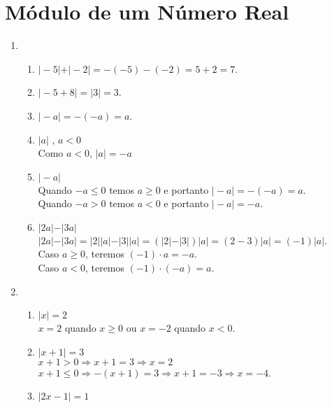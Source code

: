 \documentclass[10pt]{book}
\begin{document}
\section{Módulo de um Número Real}
\begin{enumerate}
	\setcounter{enumi}{0}
	\item %
	\begin{enumerate}
		\item %
		$\vert-5\vert + \vert-2\vert = -(-5) - (-2) = 5 + 2 = 7$.
		\item %
		$\vert-5 + 8\vert = \vert 3 \vert = 3$.
		\item %
		$\vert-a\vert = -(-a) = a$.
		\item %
		$\vert a \vert$ , $a < 0$\\
		Como $a < 0$, $\vert a \vert = -a $
		\item %
		$\vert -a \vert$\\
		Quando $-a \leq 0$ temos $a \geq 0$  e portanto $\vert -a \vert = -(-a)= a$.\\
		Quando $-a > 0$ temos $a < 0$ e portanto $\vert -a \vert = -a$.
		\item %
		$\vert 2a \vert - \vert 3a \vert$\\
		$\vert 2a \vert - \vert 3a \vert = \vert 2\vert \vert a \vert - \vert 3 \vert \vert a \vert = \left( \vert 2\vert  - \vert 3 \vert \right)\vert a \vert = \left( 2  -  3 \right)\vert a \vert = \left(-1 \right)\vert a \vert$.\\
		Caso $a \geq 0$, teremos $\left(-1\right)\cdot a = -a$.\\
		Caso $a < 0$, teremos $(-1)\cdot \left(-a\right) = a$.
	\end{enumerate}
	\item %
	\begin{enumerate}
		\item %
		$\vert x \vert = 2$\\
		$x = 2$ quando $x \geq 0$ ou $x = - 2$ quando $x < 0$.
		\item %
		$\vert x + 1 \vert = 3$\\
		$x + 1 > 0 \Rightarrow x + 1 = 3 \Rightarrow x = 2$\\
		$x + 1 \leq 0 \Rightarrow -(x + 1) = 3 \Rightarrow x + 1 = -3 \Rightarrow x = -4$.
		\item %
		$\vert 2x - 1 \vert = 1$\\

\end{enumerate}
\end{enumerate}
\end{document}
